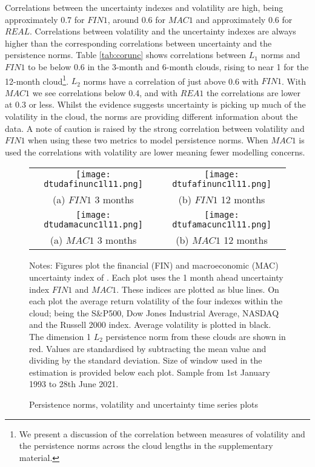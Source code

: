 \documentclass{article}
\begin{document}
Correlations between the \cite{jurado2015measuring} uncertainty indexes and volatility are high, being approximately 0.7 for $FIN1$, around 0.6 for $MAC1$ and approximately 0.6 for $REAL$. Correlations between volatility and the uncertainty indexes are always higher than the corresponding correlations between uncertainty and the persistence norms. Table \ref{tab:corunc} shows correlations between $L_1$ norms and $FIN1$ to be below 0.6 in the 3-month and 6-month clouds, rising to near 1 for the 12-month cloud\footnote{We present a discussion of the correlation between measures of volatility and the persistence norms across the cloud lengths in the supplementary material.}. $L_2$ norms have a correlation of just above 0.6 with $FIN1$. With $MAC1$ we see correlations below 0.4, and with $REA1$ the correlations are lower at 0.3 or less. Whilst the evidence suggests uncertainty is picking up much of the volatility in the cloud, the norms are providing different information about the data. A note of caution is raised by the strong correlation between volatility and $FIN1$ when using these two metrics to model persistence norms. When $MAC1$ is used the correlations with volatility are lower meaning fewer modelling concerns.

\begin{figure}
    \begin{center}
        \caption{Persistence norms, volatility and uncertainty time series plots}
        \label{fig:unc1}
        \begin{tabular}{c c}
            \texttt{[image: dtudafinunc1l11.png]} & \texttt{[image: dtufafinunc1l11.png]}  \\
            (a) $FIN1$  3 months & (b) $FIN1$ 12 months  \\ \texttt{[image: dtudamacunc1l11.png]} & \texttt{[image: dtufamacunc1l11.png]}  \\
            (a) $MAC1$ 3 months & (b) $MAC1$ 12 months  \\
        \end{tabular}
    \end{center}
\footnotesize{Notes: Figures plot the financial (FIN) and macroeconomic (MAC) uncertainty index of \cite{jurado2015measuring}. Each plot uses the 1 month ahead uncertainty index $FIN1$ and $MAC1$. These indices are plotted as blue lines. On each plot the average return volatility of the four indexes within the cloud; being the S\&P500, Dow Jones Industrial Average, NASDAQ and the Russell 2000 index. Average volatility is plotted in black. The dimension 1 $L_2$ persistence norm from these clouds are shown in red. Values are standardised by subtracting the mean value and dividing by the standard deviation. Size of window used in the estimation is provided below each plot. Sample from 1st January 1993 to 28th June 2021.}
\end{figure}
\end{document}
